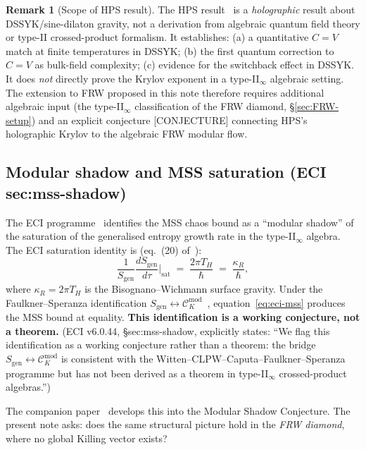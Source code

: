 \documentclass[12pt,a4paper]{article}
\theoremstyle{definition}
\newtheorem{remark}[theorem]{Remark}
\newcommand{\sgen}{S_{\mathrm{gen}}}
\newcommand{\Smod}{\mathcal{C}_K^{\mathrm{mod}}}
\begin{document}
\begin{remark}[Scope of HPS result]
\label{rem:HPS-scope}
The HPS result~\cite{HPS2024} is a \emph{holographic} result about
DSSYK/sine-dilaton gravity, not a derivation from algebraic quantum field
theory or type-II crossed-product formalism.
It establishes:
(a) a quantitative $C = V$ match at finite temperatures in DSSYK;
(b) the first quantum correction to $C = V$ as bulk-field complexity;
(c) evidence for the switchback effect in DSSYK.
It does \emph{not} directly prove the Krylov exponent in a type-II$_\infty$
algebraic setting.
The extension to FRW proposed in this note therefore requires additional
algebraic input (the type-II$_\infty$ classification of the FRW diamond,
\S\ref{sec:FRW-setup}) and an explicit conjecture [CONJECTURE] connecting
HPS's holographic Krylov to the algebraic FRW modular flow.
\end{remark}

\subsection{Modular shadow and MSS saturation (ECI sec:mss-shadow)}

The ECI programme~\cite{ECI_v6} identifies the MSS chaos bound as a
``modular shadow'' of the saturation of the generalised entropy growth rate
in the type-II$_\infty$ algebra.
The ECI saturation identity is (eq.~(20) of~\cite{ECI_v6}):
\begin{equation}
  \frac{1}{\sgen} \frac{d\sgen}{d\tau}\bigg|_{\mathrm{sat}}
  \;=\; \frac{2\pi T_H}{\hbar}
  \;=\; \frac{\kappa_R}{\hbar},
  \label{eq:eci-mss}
\end{equation}
where $\kappa_R = 2\pi T_H$ is the Bisognano--Wichmann surface gravity.
Under the Faulkner--Speranza identification $\sgen \leftrightarrow
\Smod$~\cite{FaulknerSperanza2024},
equation~\eqref{eq:eci-mss} produces the MSS bound at equality.
\textbf{This identification is a working conjecture, not a theorem.}
(ECI v6.0.44, \S sec:mss-shadow, explicitly states: ``We flag this
identification as a working conjecture rather than a theorem:
the bridge $\sgen \leftrightarrow \Smod$ is consistent with the
Witten--CLPW--Caputa--Faulkner--Speranza programme but has not been
derived as a theorem in type-II$_\infty$ crossed-product algebras.'')

The companion paper~\cite{ModularShadow} develops this into the
Modular Shadow Conjecture.
The present note asks: does the same structural picture hold in the
\emph{FRW diamond}, where no global Killing vector exists?
\end{document}
